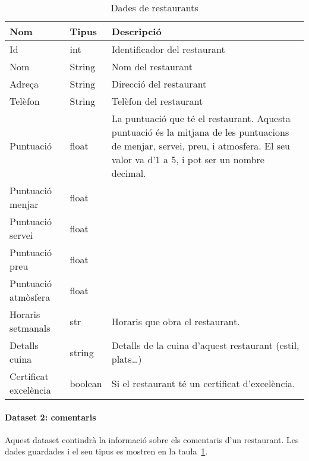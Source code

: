 \documentclass{article}
\begin{document}
\begin{table}[h]
	\centering
    \begin{tabular}{|p{}|p{}|p{}|}
		\hline
        Nom       & Tipus  & Descripció \\\hline\hline
		Id		  & int	   & Identificador del restaurant \\\hline
        Nom       & String & Nom del restaurant \\\hline
        Adreça    & String & Direcció del restaurant \\\hline
        Telèfon   & String & Telèfon del restaurant \\\hline
        Puntuació & float  & La puntuació que té el restaurant. Aquesta
                             puntuació és la mitjana de les puntuacions de
                             menjar, servei, preu, i atmosfera. El seu valor
                             va d'1 a 5, i pot ser un nombre decimal. \\\hline
        Puntuació menjar & float & \\\hline
        Puntuació servei & float & \\\hline
        Puntuació preu & float & \\\hline
        Puntuació atmòsfera & float & \\\hline
        Horaris setmanals & str & Horaris que obra el restaurant. \\\hline %
        Detalls cuina & string & Detalls de la cuina d'aquest restaurant (estil,
                                 plats\dots) \\\hline
        Certificat excelència & boolean & Si el restaurant té un certificat
                                          d'excelència. \\\hline
    \end{tabular}
    \caption{Dades de restaurants}
    \label{table:dataset1_data}
\end{table}

\paragraph{Dataset 2: comentaris} %
Aquest dataset contindrà la informació sobre els comentaris d'un restaurant.
Les dades guardades i el seu tipus es mostren en la
taula~\ref{table:dataset1_data}.
\end{document}
